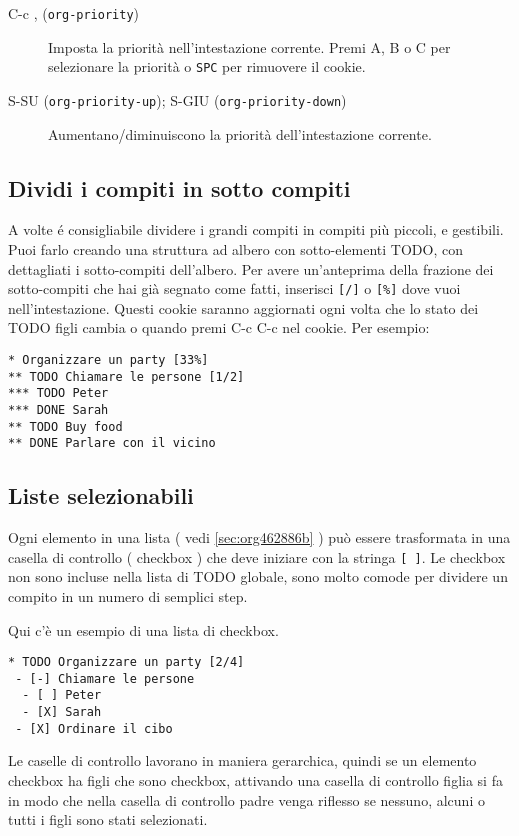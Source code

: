 \documentclass[11pt]{article}
\begin{document}
\begin{description}
\item[{C-c , (\texttt{org-priority})}] Imposta la priorità nell'intestazione corrente. Premi A,
B o C per selezionare la priorità o \texttt{SPC} per
rimuovere il cookie.

\item[{S-SU (\texttt{org-priority-up}); S-GIU (\texttt{org-priority-down})}] Aumentano/diminuiscono la priorità dell'intestazione corrente.
\end{description}

\subsection[Breaking Down Tasks]{Dividi i compiti in sotto compiti}
\label{sec:org611fd63}
A volte é consigliabile dividere i grandi compiti in compiti più
piccoli, e gestibili. Puoi farlo creando una struttura
ad albero con sotto-elementi TODO, con dettagliati i sotto-compiti
dell'albero. Per avere un'anteprima della frazione dei sotto-compiti
che hai già segnato come fatti, inserisci \texttt{[/]} o \texttt{[\%]} dove vuoi
nell'intestazione. Questi cookie saranno aggiornati ogni volta che lo
stato dei TODO figli cambia o quando premi C-c C-c nel
cookie. Per esempio:

\begin{verbatim}
* Organizzare un party [33%]
** TODO Chiamare le persone [1/2]
*** TODO Peter
*** DONE Sarah
** TODO Buy food
** DONE Parlare con il vicino
\end{verbatim}

\subsection{Liste selezionabili}
\label{sec:org3cb803e}
Ogni elemento in una lista ( vedi \ref{sec:org462886b} ) può essere
trasformata in una casella di controllo ( checkbox ) che deve iniziare con
la stringa \texttt{[ ]}. Le checkbox non sono incluse nella lista di TODO
globale, sono molto comode per dividere un compito in un numero di
semplici step.

Qui c'è un esempio di una lista di checkbox.

\begin{verbatim}
* TODO Organizzare un party [2/4]
 - [-] Chiamare le persone
  - [ ] Peter
  - [X] Sarah
 - [X] Ordinare il cibo
\end{verbatim}

Le caselle di controllo lavorano in maniera gerarchica, quindi se un
elemento checkbox ha figli che sono checkbox, attivando una casella di
controllo figlia si fa in modo che nella casella di controllo padre
venga riflesso se nessuno, alcuni o tutti i figli sono stati selezionati.
\end{document}
